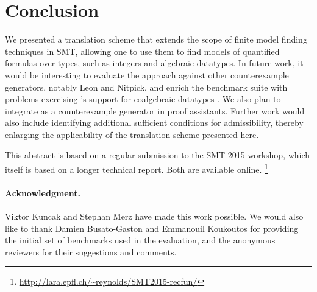 \section{Conclusion}
\label{sec:conclusion}

We presented a translation scheme that extends the scope of finite model finding 
techniques in SMT, allowing one to use them to find models of quantified formulas 
over  types, such as integers and algebraic datatypes.
%
In future work, it would be interesting to evaluate the approach against other
counterexample generators, notably Leon and Nitpick, and enrich the benchmark
suite with problems exercising \cvc's support for coalgebraic datatypes
\cite{reynolds-blanchette-2015-codata}. We also plan to integrate \cvc as a
counterexample generator in proof assistants. Further work would also
include identifying additional sufficient conditions for admissibility, thereby
enlarging the applicability of the translation scheme presented here.


\begin{tinyv}
This abstract is based on a regular submission to the SMT 2015 workshop,
which itself is based on a longer technical report. Both are available online.%
\footnote{\url{http://lara.epfl.ch/~reynolds/SMT2015-recfun/}}
\end{tinyv}

{%
\def\ackname{Acknowledgment}
\paragraph{%
\ackname.}
Viktor Kuncak and Stephan Merz have made this work possible. We would also like
to thank Damien Busato-Gaston and Emmanouil Koukoutos for providing the initial
set of benchmarks used in the evaluation, and the anonymous reviewers for their
suggestions and comments.
}

{


}


